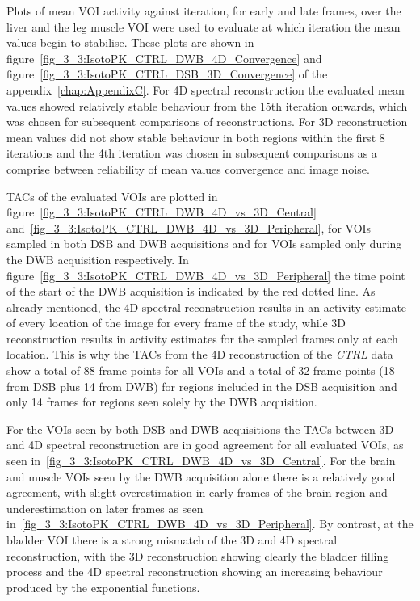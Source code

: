 Plots of mean VOI activity against iteration, for early and late frames, over the liver and the leg muscle VOI were used to evaluate at which iteration the mean values begin to stabilise. These plots are shown in figure~\ref{fig_3_3:IsotoPK_CTRL_DWB_4D_Convergence} and figure~\ref{fig_3_3:IsotoPK_CTRL_DSB_3D_Convergence} of the appendix~\ref{chap:AppendixC}. For 4D spectral reconstruction the evaluated mean values showed relatively stable behaviour from the 15th iteration onwards, which was chosen for subsequent comparisons of reconstructions. For 3D reconstruction mean values did not show stable behaviour in both regions within the first 8 iterations and the 4th iteration was chosen in subsequent comparisons as a comprise between reliability of mean values convergence and image noise.  

TACs of the evaluated VOIs are plotted in figure~\ref{fig_3_3:IsotoPK_CTRL_DWB_4D_vs_3D_Central} and~\ref{fig_3_3:IsotoPK_CTRL_DWB_4D_vs_3D_Peripheral}, for VOIs sampled in both DSB and DWB acquisitions and for VOIs sampled only during the DWB acquisition respectively. In figure~\ref{fig_3_3:IsotoPK_CTRL_DWB_4D_vs_3D_Peripheral} the time point of the start of the DWB acquisition is indicated by the red dotted line.
As already mentioned, the 4D spectral reconstruction results in an activity estimate of every location of the image for every frame of the study, while 3D reconstruction results in activity estimates for the sampled frames only at each location. This is why the TACs from the 4D reconstruction of the \textit{CTRL} data show a total of 88 frame points for all VOIs and a total of 32 frame points (18 from DSB plus 14 from DWB) for regions included in the DSB acquisition and only 14 frames for regions seen solely by the DWB acquisition. 

For the VOIs seen by both DSB and DWB acquisitions the TACs between 3D and 4D spectral reconstruction are in good agreement for all evaluated VOIs, as seen in~\ref{fig_3_3:IsotoPK_CTRL_DWB_4D_vs_3D_Central}. For the brain and muscle VOIs seen by the DWB acquisition alone there is a relatively good agreement, with slight overestimation in early frames of the brain region and underestimation on later frames as seen in~\ref{fig_3_3:IsotoPK_CTRL_DWB_4D_vs_3D_Peripheral}. By contrast, at the bladder VOI there is a strong mismatch of the 3D and 4D spectral reconstruction, with the 3D reconstruction showing clearly the bladder filling process and the 4D spectral reconstruction showing an increasing behaviour produced by the exponential functions. 

